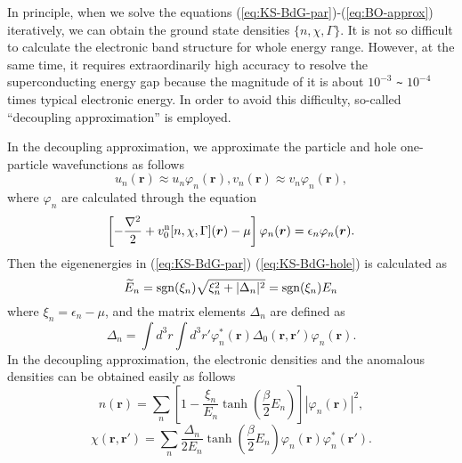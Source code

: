 In principle, when we solve the equations (\ref{eq:KS-BdG-par})-(\ref{eq:BO-approx}) iteratively, 
we can obtain the ground state densities $\{n, \chi, \Gamma\}$.
It is not so difficult to calculate the electronic band structure for whole energy range.
However, at the same time, it requires extraordinarily high accuracy to resolve the superconducting energy gap
because the magnitude of it is about $10^{-3}$ \verb|~| $10^{-4}$ times typical electronic energy.
In order to avoid this difficulty, so-called ``decoupling approximation''\cite{Gross1991,KurthphD,LudersphD} is employed.

In the decoupling approximation, we approximate the particle and hole one-particle wavefunctions as follows
%
\begin{equation}
	u_n(\bm{r}) \approx u_n\varphi_n(\bm{r}),   v_n(\bm{r}) \approx v_n\varphi_n(\bm{r}), 
	\label{eq:approx-wfc}
\end{equation}
%
where $\varphi_n$ are calculated through the equation
\begin{equation}
	\left[ -\frac{\nabla^2}{2} + v^{\rm n}_0[n, \chi, \Gamma](\bm{r}) - \mu \right]
	\varphi_n(\bm{r}) = \epsilon_n\varphi_n(\bm{r}).
	\label{eq:KS-eq}
\end{equation}
%
Then the eigenenergies in (\ref{eq:KS-BdG-par}) (\ref{eq:KS-BdG-hole}) is calculated as
%
\begin{equation}
	\widetilde{E}_n = {\rm sgn}(\xi_n)\sqrt{\xi^2_n + |\Delta_n|^2}
	                = {\rm sgn}(\xi_n) E_n
			\label{eq:KS-energy}
\end{equation}
%
where $\xi_n = \epsilon_n - \mu$, and the matrix elements $\Delta_n$ are defined as
%
\begin{equation}
	\Delta_n = \int d^3r\int d^3r' \varphi^{\ast}_n(\bm{r})\Delta_0(\bm{r}, \bm{r'})\varphi_n(\bm{r}).
	\label{eq:Deltan}
\end{equation}
%
In the decoupling approximation, the electronic densities and the anomalous densities 
can be obtained easily as follows
%
\begin{equation}
	n(\bm{r}) = \sum_{n} \left[1-\frac{\xi_n}{E_n}\tanh \left(\frac{\beta}{2}E_n \right) \right]
	                     |\varphi_n(\bm{r})|^2,
	\label{eq:el-density}
\end{equation}
%
\begin{equation}
	\chi(\bm{r}, \bm{r'}) = \sum_{n}\frac{\Delta_n}{2E_n}\tanh \left(\frac{\beta}{2}E_n \right)
	\varphi_n(\bm{r})\varphi^{\ast}_n(\bm{r'}).
	\label{eq:anom-density}
\end{equation}
%

